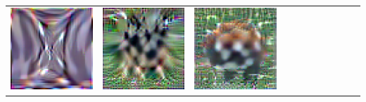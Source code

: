 {\begin{center}
\begin{tabular}{ccccccccccc}
    \includegraphics[align=c,width=\coverwidth\linewidth]{figures/cover/tiny/hourglass_0.pdf} &
    \includegraphics[align=c,width=\coverwidth\linewidth]{figures/cover/tiny/z_german_shepherd_0.pdf} &
    \includegraphics[align=c,width=\coverwidth\linewidth]{figures/cover/tiny/lesser_panda_0.pdf} &

\end{tabular}
\end{center}}
